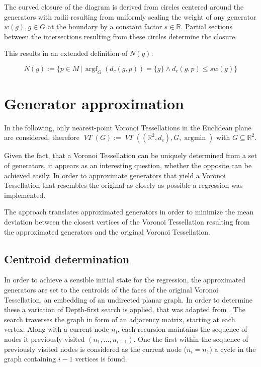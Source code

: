 \documentclass[a4paper]{article}
\DeclareMathOperator*{\argf}{argf}
\DeclareMathOperator*{\argmin}{argmin}
\DeclareMathOperator*{\VT}{\textit{VT}}
\begin{document}
The curved closure of the diagram
is derived from circles centered around the generators with radii resulting from uniformly
scaling the weight of any generator \(w(g), g \in G\) at the boundary by a constant factor \(s \in \mathbb{R}\).
Partial sections between the intersections resulting from these circles determine the closure.

This results in an extended definition of \(N(g)\):

\[N(g) := \{p \in M \,|\, \argf_{G} (d_c(g, p)) = \{g\} \land d_c(g, p) \leq sw(g)\}\]

\section{Generator approximation}
In the following, only nearest-point Voronoi Tessellations in the Euclidean plane are considered, therefore
\(\VT(G) := \VT((\mathbb{R}^2, d_e), G, \argmin)\) with \(G \subseteq \mathbb{R}^2\).

Given the fact, that a Voronoi Tessellation can be uniquely determined from a set of generators, it appears as
an interesting question, whether the opposite can be achieved easily. In order to approximate generators that yield
a Voronoi Tessellation that resembles the original as closely as possible a regression was implemented.

The approach translates approximated generators in order to minimize the mean deviation between the closest vertices of the
Voronoi Tessellation resulting from the approximated generators and the original Voronoi Tessellation.

\subsection{Centroid determination}
In order to achieve a sensible initial state for the regression, the approximated generators are set to the centroids
of the faces of the original Voronoi Tessellation, an embedding of an undirected planar graph.
In order to determine these a variation of Depth-first search is applied,
that was adapted from \cite{Schneider2015}. The search traverses the graph in form of an adjacency matrix,
starting at each vertex.
Along with a current node \(n_i\), each recursion maintains the sequence of nodes it
previously visited \((n_{1}, \dots, n_{i-1})\).
One the first within the sequence  of previously visited nodes is considered as the current node (\(n_i = n_1\))
a cycle in the graph containing \(i-1\) vertices is found.
\end{document}
